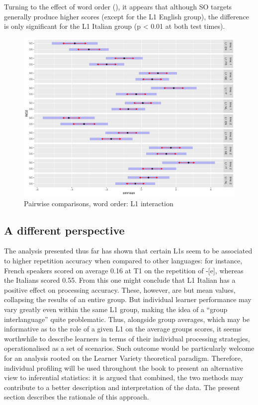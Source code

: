 Turning to the effect of word order (), it appears that although SO targets generally produce higher scores (except for the L1 English group), the difference is only significant for the L1 Italian group (p < 0.01 at both test times).

\begin{figure}
    \includegraphics[width=\textwidth]{figures/04-4.pdf}
    \caption{Pairwise comparisons, word order: L1 interaction}
    \label{fig:04:4}
\end{figure}

\subsection{A different perspective}\label{sec:04:2.4}

The analysis presented thus far has shown that certain L1s seem to be associated to higher repetition accuracy when compared to other languages: for instance, French speakers scored on average 0.16 at T1 on the repetition of -[e], whereas the Italians scored 0.55. From this one might conclude that L1 Italian has a positive effect on processing accuracy. These, however, are but mean values, collapsing the results of an entire group. But individual learner performance may vary greatly even within the same L1 group, making the idea of a ``group interlanguage'' quite problematic. Thus, alongside group averages, which may be informative as to the role of a given L1 on the average groups scores, it seems worthwhile to describe learners in terms of their individual processing strategies, operationalised as a set of scenarios. Such outcome would be particularly welcome for an analysis rooted on the Learner Variety theoretical paradigm. Therefore, individual profiling will be used throughout the book to present an alternative view to inferential statistics: it is argued that combined, the two methods may contribute to a better description and interpretation of the data. The present section describes the rationale of this approach.


